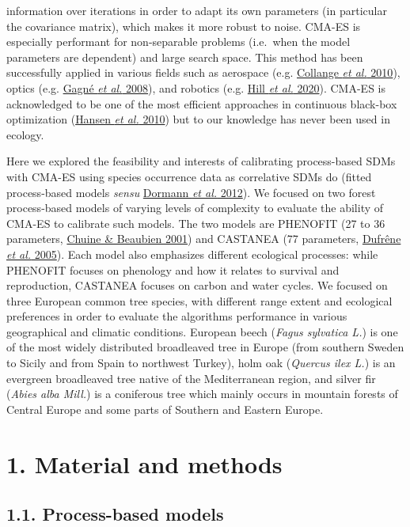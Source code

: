 \documentclass[11pt,]{article}
\begin{document}
information over iterations in order to adapt its own parameters (in
particular the covariance matrix), which makes it more robust to noise.
CMA-ES is especially performant for non-separable problems (i.e.~when
the model parameters are dependent) and large search space. This method
has been successfully applied in various fields such as aerospace (e.g.
\protect\hyperlink{ref-Collange2010}{Collange \emph{et al.} 2010}),
optics (e.g. \protect\hyperlink{ref-Gagne2008}{Gagné \emph{et al.}
2008}), and robotics (e.g. \protect\hyperlink{ref-Hill2020}{Hill
\emph{et al.} 2020}). CMA-ES is acknowledged to be one of the most
efficient approaches in continuous black-box optimization
(\protect\hyperlink{ref-Hansen2010}{Hansen \emph{et al.} 2010}) but to
our knowledge has never been used in ecology.

Here we explored the feasibility and interests of calibrating
process-based SDMs with CMA-ES using species occurrence data as
correlative SDMs do (fitted process-based models \emph{sensu}
\protect\hyperlink{ref-Dormann2012}{Dormann \emph{et al.} 2012}). We
focused on two forest process-based models of varying levels of
complexity to evaluate the ability of CMA-ES to calibrate such models.
The two models are PHENOFIT (27 to 36 parameters,
\protect\hyperlink{ref-Chuine2001}{Chuine \& Beaubien 2001}) and
CASTANEA (77 parameters, \protect\hyperlink{ref-Dufrene2005}{Dufrêne
\emph{et al.} 2005}). Each model also emphasizes different ecological
processes: while PHENOFIT focuses on phenology and how it relates to
survival and reproduction, CASTANEA focuses on carbon and water cycles.
We focused on three European common tree species, with different range
extent and ecological preferences in order to evaluate the algorithms
performance in various geographical and climatic conditions. European
beech (\emph{Fagus sylvatica L.}) is one of the most widely distributed
broadleaved tree in Europe (from southern Sweden to Sicily and from
Spain to northwest Turkey), holm oak (\emph{Quercus ilex L.}) is an
evergreen broadleaved tree native of the Mediterranean region, and
silver fir (\emph{Abies alba Mill.}) is a coniferous tree which mainly
occurs in mountain forests of Central Europe and some parts of Southern
and Eastern Europe.

\hypertarget{methods}{%
\section{1. Material and methods}\label{methods}}

\hypertarget{pbmodels}{%
\subsection{1.1. Process-based models}\label{pbmodels}}
\end{document}
